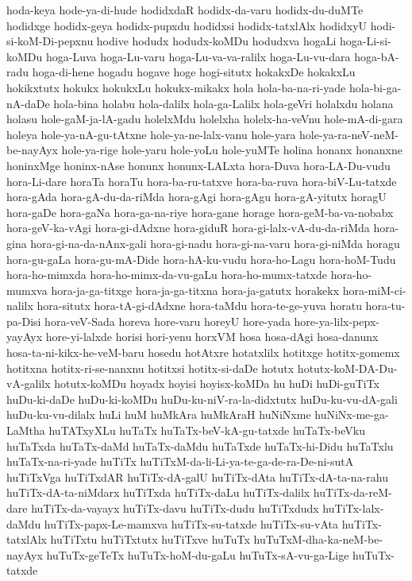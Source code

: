 {hoda-keya
hode-ya-di-hude
hodidxdaR
hodidx-da-varu
hodidx-du-duMTe
hodidxge
hodidx-geya
hodidx-pupxdu
hodidxsi
hodidx-tatxlAlx
hodidxyU
hodi-si-koM-Di-pepxnu
hodive
hodudx
hodudx-koMDu
hodudxva
hogaLi
hoga-Li-si-koMDu
hoga-Luva
hoga-Lu-varu
hoga-Lu-va-va-ralilx
hoga-Lu-vu-dara
hoga-bA-radu
hoga-di-hene
hogadu
hogave
hoge
hogi-situtx
hokakxDe
hokakxLu
hokikxtutx
hokukx
hokukxLu
hokukx-mikakx
hola
hola-ba-na-ri-yade
hola-bi-ga-nA-daDe
hola-bina
holabu
hola-dalilx
hola-ga-Lalilx
hola-geVri
holalxdu
holana
holasu
hole-gaM-ja-lA-gadu
holelxMdu
holelxha
holelx-ha-veVnu
hole-mA-di-gara
holeya
hole-ya-nA-gu-tAtxne
hole-ya-ne-lalx-vanu
hole-yara
hole-ya-ra-neV-neM-be-nayAyx
hole-ya-rige
hole-yaru
hole-yoLu
hole-yuMTe
holina
honanx
honanxne
honinxMge
honinx-nAse
honunx
honunx-LALxta
hora-Duva
hora-LA-Du-vudu
hora-Li-dare
horaTa
horaTu
hora-ba-ru-tatxve
hora-ba-ruva
hora-biV-Lu-tatxde
hora-gAda
hora-gA-du-da-riMda
hora-gAgi
hora-gAgu
hora-gA-yitutx
horagU
hora-gaDe
hora-gaNa
hora-ga-na-riye
hora-gane
horage
hora-geM-ba-va-nobabx
hora-geV-ka-vAgi
hora-gi-dAdxne
hora-giduR
hora-gi-lalx-vA-du-da-riMda
hora-gina
hora-gi-na-da-nAnx-gali
hora-gi-nadu
hora-gi-na-varu
hora-gi-niMda
horagu
hora-gu-gaLa
hora-gu-mA-Dide
hora-hA-ku-vudu
hora-ho-Lagu
hora-hoM-Tudu
hora-ho-mimxda
hora-ho-mimx-da-vu-gaLu
hora-ho-mumx-tatxde
hora-ho-mumxva
hora-ja-ga-titxge
hora-ja-ga-titxna
hora-ja-gatutx
horakekx
hora-miM-ci-nalilx
hora-situtx
hora-tA-gi-dAdxne
hora-taMdu
hora-te-ge-yuva
horatu
hora-tu-pa-Disi
hora-veV-Sada
horeva
hore-varu
horeyU
hore-yada
hore-ya-lilx-pepx-yayAyx
hore-yi-lalxde
horisi
hori-yenu
horxVM
hosa
hosa-dAgi
hosa-danunx
hosa-ta-ni-kikx-he-veM-baru
hosedu
hotAtxre
hotatxlilx
hotitxge
hotitx-gomemx
hotitxna
hotitx-ri-se-nanxnu
hotitxsi
hotitx-si-daDe
hotutx
hotutx-koM-DA-Du-vA-galilx
hotutx-koMDu
hoyadx
hoyisi
hoyisx-koMDa
hu
huDi
huDi-guTiTx
huDu-ki-daDe
huDu-ki-koMDu
huDu-ku-niV-ra-la-didxtutx
huDu-ku-vu-dA-gali
huDu-ku-vu-dilalx
huLi
huM
huMkAra
huMkAraH
huNiNxme
huNiNx-me-ga-LaMtha
huTATxyXLu
huTaTx
huTaTx-beV-kA-gu-tatxde
huTaTx-beVku
huTaTxda
huTaTx-daMd
huTaTx-daMdu
huTaTxde
huTaTx-hi-Didu
huTaTxlu
huTaTx-na-ri-yade
huTiTx
huTiTxM-da-li-Li-ya-te-ga-de-ra-De-ni-sutA
huTiTxVga
huTiTxdAR
huTiTx-dA-galU
huTiTx-dAta
huTiTx-dA-ta-na-rahu
huTiTx-dA-ta-niMdarx
huTiTxda
huTiTx-daLu
huTiTx-dalilx
huTiTx-da-reM-dare
huTiTx-da-vayayx
huTiTx-davu
huTiTx-dudu
huTiTxdudx
huTiTx-lalx-daMdu
huTiTx-papx-Le-mamxva
huTiTx-su-tatxde
huTiTx-su-vAta
huTiTx-tatxlAlx
huTiTxtu
huTiTxtutx
huTiTxve
huTuTx
huTuTxM-dha-ka-neM-be-nayAyx
huTuTx-geTeTx
huTuTx-hoM-du-gaLu
huTuTx-sA-vu-ga-Lige
huTuTx-tatxde
}
